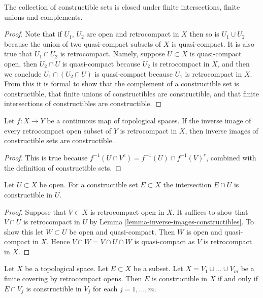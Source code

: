 \begin{lemma}
\label{lemma-constructible}
The collection of constructible sets is closed under
finite intersections, finite unions and complements.
\end{lemma}

\begin{proof}
Note that if $U_1$, $U_2$ are open and retrocompact in $X$
then so is $U_1 \cup U_2$ because the union of two quasi-compact
subsets of $X$ is quasi-compact. It is also true that
$U_1 \cap U_2$ is retrocompact. Namely, suppose $U \subset X$
is quasi-compact open, then $U_2 \cap U$ is quasi-compact because
$U_2$ is retrocompact in $X$, and then we conclude
$U_1 \cap (U_2 \cap U)$ is quasi-compact because $U_1$ is
retrocompact in $X$. From this it is formal to show that
the complement of a constructible set is constructible,
that finite unions of constructibles are constructible, and
that finite intersections of constructibles are constructible.
\end{proof}

\begin{lemma}
\label{lemma-inverse-images-constructibles}
Let $f : X \to Y$ be a continuous map of topological spaces.
If the inverse image of every retrocompact open subset of $Y$
is retrocompact in $X$, then inverse images of constructible
sets are constructible.
\end{lemma}

\begin{proof}
This is true because $f^{-1}(U \cap V^c) = f^{-1}(U) \cap f^{-1}(V)^c$,
combined with the definition of constructible sets.
\end{proof}

\begin{lemma}
\label{lemma-open-immersion-constructible-inverse-image}
Let $U \subset X$ be open. For a constructible set
$E \subset X$ the intersection $E \cap U$ is constructible
in $U$.
\end{lemma}

\begin{proof}
Suppose that $V \subset X$ is retrocompact open in $X$.
It suffices to show that $V \cap U$ is retrocompact in $U$
by Lemma \ref{lemma-inverse-images-constructibles}. To show this
let $W \subset U$ be open and quasi-compact. Then $W$
is open and quasi-compact in $X$. Hence $V \cap W = V \cap U \cap W$
is quasi-compact as $V$ is retrocompact in $X$.
\end{proof}

\begin{lemma}
\label{lemma-collate-construcible}
Let $X$ be a topological space. Let $E \subset X$ be a subset.
Let $X = V_1 \cup \ldots \cup V_m$ be a finite covering by
retrocompact opens.
Then $E$ is constructible in $X$ if and only if $E \cap V_j$
is constructible in $V_j$ for each $j = 1, \ldots, m$.
\end{lemma}

